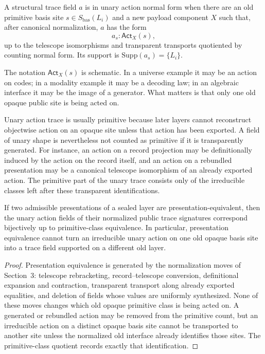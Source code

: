 \begin{definition}
A structural trace field \(a\) is in unary action normal form when there are an old primitive
basis site \(s\in S_{\mathrm{bas}}(L_i)\) and a new payload component \(X\) such that, after
canonical normalization, \(a\) has the form
\[
  a_s : \mathsf{Act}_X(s),
\]
up to the telescope isomorphisms and transparent transports quotiented by counting normal
form.  Its support is \(\mathrm{Supp}(a_s)=\{L_i\}\).
\end{definition}

The notation \(\mathsf{Act}_X(s)\) is schematic.  In a universe example it may be an action
on codes; in a modality example it may be a decoding law; in an algebraic interface it may
be the image of a generator.  What matters is that only one old opaque public site is being
acted on.

Unary action trace is usually primitive because later layers cannot reconstruct objectwise
action on an opaque site unless that action has been exported.  A field of unary shape is
nevertheless not counted as primitive if it is transparently generated.  For instance, an
action on a record projection may be definitionally induced by the action on the record
itself, and an action on a rebundled presentation may be a canonical telescope isomorphism
of an already exported action.  The primitive part of the unary trace consists only of the
irreducible classes left after these transparent identifications.

\begin{lemma}
If two admissible presentations of a sealed layer are presentation-equivalent, then the unary
action fields of their normalized public trace signatures correspond bijectively up to
primitive-class equivalence.  In particular, presentation equivalence cannot turn an
irreducible unary action on one old opaque basis site into a trace field supported on a
different old layer.
\end{lemma}

\begin{proof}
Presentation equivalence is generated by the normalization moves of Section~3: telescope
rebracketing, record--telescope conversion, definitional expansion and contraction,
transparent transport along already exported equalities, and deletion of fields whose values
are uniformly synthesized.  None of these moves changes which old opaque primitive class is
being acted on.  A generated or rebundled action may be removed from the primitive count,
but an irreducible action on a distinct opaque basis site cannot be transported to another
site unless the normalized old interface already identifies those sites.  The primitive-class
quotient records exactly that identification.
\end{proof}

